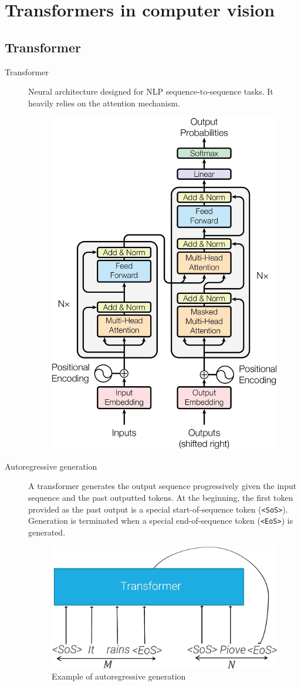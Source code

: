 \chapter{Transformers in computer vision}



\section{Transformer}

\begin{description}
    \item[Transformer] 
        Neural architecture designed for NLP sequence-to-sequence tasks. It heavily relies on the attention mechanism.
        \begin{figure}[H]
            \centering
            \includegraphics[width=0.4\linewidth]{./img/transformer.jpg}
        \end{figure}

    \item[Autoregressive generation] 
        A transformer generates the output sequence progressively given the input sequence and the past outputted tokens. At the beginning, the first token provided as the past output is a special start-of-sequence token (\texttt{<SoS>}). Generation is terminated when a special end-of-sequence token (\texttt{<EoS>}) is generated.

        \begin{figure}[H]
            \centering
            \includegraphics[width=0.3\linewidth]{./img/_transformer_autoregressive.jpg}
            \caption{Example of autoregressive generation}
        \end{figure}
\end{description}


